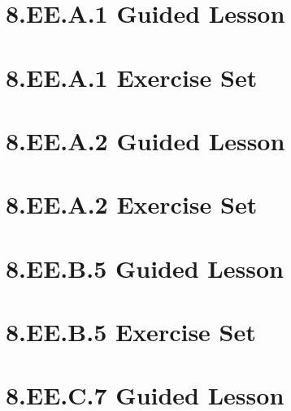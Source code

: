 \documentclass[a4paper,12pt]{article}
\title{}
\date{}
\begin{document}

\newpage

\hypertarget{toc}{}
\tableofcontents
\newpage

\pagestyle{fancy}

\newpage
\section{8.EE.A.1 Guided Lesson}


\newpage
\section{8.EE.A.1 Exercise Set}


\newpage
\section{8.EE.A.2 Guided Lesson}


\newpage
\section{8.EE.A.2 Exercise Set}


\newpage
\section{8.EE.B.5 Guided Lesson}


\newpage
\section{8.EE.B.5 Exercise Set}


\newpage
\section{8.EE.C.7 Guided Lesson}

\end{document}
